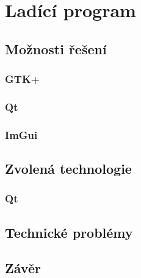 \chapter{Ladící program}

\blind[2]

\section{Možnosti řešení}

\blind[1]

\subsection{GTK+}

\blind[1]

\subsection{Qt}

\blind[2]

\subsection{ImGui}

\blind[3]

\section{Zvolená technologie}

\subsection{Qt}

\blind[1]

\section{Technické problémy}

\blind[4]

\section{Závěr}

\blind[1]